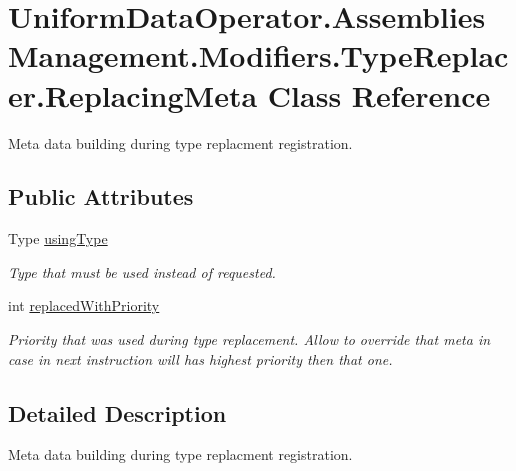 \hypertarget{class_uniform_data_operator_1_1_assemblies_management_1_1_modifiers_1_1_type_replacer_1_1_replacing_meta}{}\section{Uniform\+Data\+Operator.\+Assemblies\+Management.\+Modifiers.\+Type\+Replacer.\+Replacing\+Meta Class Reference}
\label{class_uniform_data_operator_1_1_assemblies_management_1_1_modifiers_1_1_type_replacer_1_1_replacing_meta}


Meta data building during type replacment registration.  


\subsection*{Public Attributes}
\begin{DoxyCompactItemize}
\item 
Type \mbox{\hyperlink{class_uniform_data_operator_1_1_assemblies_management_1_1_modifiers_1_1_type_replacer_1_1_replacing_meta_aa2bcb9c1376fd1f1dba1d7fe3c51b105}{using\+Type}}
\begin{DoxyCompactList}\small\item\em Type that must be used instead of requested. \end{DoxyCompactList}\item 
int \mbox{\hyperlink{class_uniform_data_operator_1_1_assemblies_management_1_1_modifiers_1_1_type_replacer_1_1_replacing_meta_ac1e6b32459f6ec0bfd07c1c26d682a61}{replaced\+With\+Priority}}
\begin{DoxyCompactList}\small\item\em Priority that was used during type replacement. Allow to override that meta in case in next instruction will has highest priority then that one. \end{DoxyCompactList}\end{DoxyCompactItemize}


\subsection{Detailed Description}
Meta data building during type replacment registration. 



